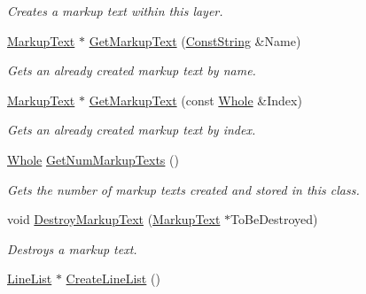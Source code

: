 \begin{DoxyCompactItemize}
\begin{DoxyCompactList}\small\item\em Creates a markup text within this layer. \item\end{DoxyCompactList}\item 
\hyperlink{classphys_1_1UI_1_1MarkupText}{MarkupText} $\ast$ \hyperlink{classphys_1_1UI_1_1Layer_aed2d7a1ad478f3d92005aeec4a777473}{GetMarkupText} (\hyperlink{namespacephys_a5ce5049f8b4bf88d6413c47b504ebb31}{ConstString} \&Name)
\begin{DoxyCompactList}\small\item\em Gets an already created markup text by name. \item\end{DoxyCompactList}\item 
\hyperlink{classphys_1_1UI_1_1MarkupText}{MarkupText} $\ast$ \hyperlink{classphys_1_1UI_1_1Layer_ae69320aefcfbc6f7f8c7364a04b2ae59}{GetMarkupText} (const \hyperlink{namespacephys_a460f6bc24c8dd347b05e0366ae34f34a}{Whole} \&Index)
\begin{DoxyCompactList}\small\item\em Gets an already created markup text by index. \item\end{DoxyCompactList}\item 
\hyperlink{namespacephys_a460f6bc24c8dd347b05e0366ae34f34a}{Whole} \hyperlink{classphys_1_1UI_1_1Layer_acc0fbbeabb701ad86826312b2ce88d60}{GetNumMarkupTexts} ()
\begin{DoxyCompactList}\small\item\em Gets the number of markup texts created and stored in this class. \item\end{DoxyCompactList}\item 
void \hyperlink{classphys_1_1UI_1_1Layer_a30a9991d13023b2bb941dab0667f91e6}{DestroyMarkupText} (\hyperlink{classphys_1_1UI_1_1MarkupText}{MarkupText} $\ast$ToBeDestroyed)
\begin{DoxyCompactList}\small\item\em Destroys a markup text. \item\end{DoxyCompactList}\item 
\hypertarget{classphys_1_1UI_1_1Layer_a16c50950bb79c8b06a046f2820329728}{
\hyperlink{classphys_1_1UI_1_1LineList}{LineList} $\ast$ \hyperlink{classphys_1_1UI_1_1Layer_a16c50950bb79c8b06a046f2820329728}{CreateLineList} ()}
\label{classphys_1_1UI_1_1Layer_a16c50950bb79c8b06a046f2820329728}


\end{DoxyCompactItemize}
